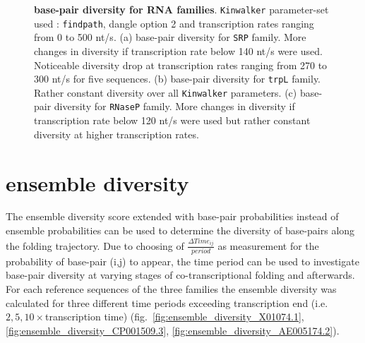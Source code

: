 \documentclass[ twoside,openright,titlepage,numbers=noenddot,headinclude,%
                footinclude=false, cleardoublepage=empty,abstractoff, %
                BCOR=5mm,paper=a4,fontsize=11pt,%
                ngerman,american,%
                ]{scrreprt}
\begin{document}
\begin{figure}[ht]
\caption{ {\bf base-pair diversity for RNA families}.
\texttt{Kinwalker} parameter-set used : \texttt{findpath}, dangle option 2 and transcription rates ranging from 0 to 500 nt/s.
(a) base-pair diversity for \texttt{SRP} family. 
More changes in diversity if transcription rate below 140 nt/s were used. Noticeable diversity drop at transcription rates ranging from 270 to 300 nt/s for five sequences.
(b) base-pair diversity for \texttt{trpL} family. 
Rather constant diversity over all \texttt{Kinwalker} parameters.
(c) base-pair diversity for \texttt{RNaseP} family. 
More changes in diversity if transcription rate below 120 nt/s were used but rather constant diversity at higher transcription rates.}
\label{fig:base-pair diversity alignments}
\end{figure}

			
%			
				
\FloatBarrier	
\section{ensemble diversity} \label{result:ensemble diversity}

The ensemble diversity score extended with base-pair probabilities instead of ensemble probabilities can be used to determine 
the diversity of base-pairs along the folding trajectory. Due to choosing of $\frac{\Delta
  Time_{ij}}{period}$ as measurement for the probability of base-pair (i,j) to appear, the time period can be used to investigate base-pair diversity at varying stages of co-transcriptional folding and afterwards.
For each reference sequences of the three families the ensemble diversity
was calculated for three different time periods exceeding transcription end
(i.e. $2,5,10 \times$transcription time) (fig.~\ref{fig:ensemble_diversity_X01074.1}, \ref{fig:ensemble_diversity_CP001509.3},  \ref{fig:ensemble_diversity_AE005174.2}). 
\end{document}
